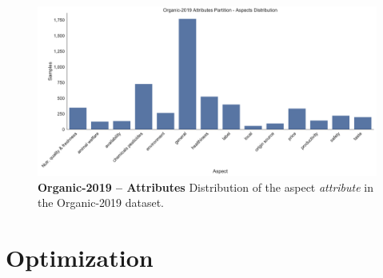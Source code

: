 \begin{figure}[H]
    \centering
    \includegraphics[width=\textwidth]{figures/05_setup/05_organicAttributes}
    \caption{\textbf{Organic-2019 -- Attributes} Distribution of the aspect \textit{attribute} in the Organic-2019 dataset.}
    \label{fig:05_organic2019_Attributes}
\end{figure}

    

\section{Optimization}

